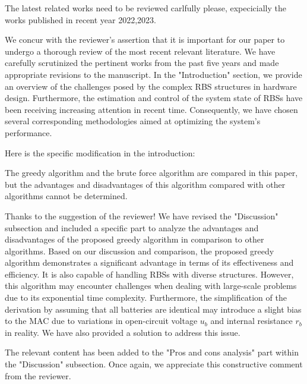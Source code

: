 \reviewer
\begin{revcomment}
  The latest related works need to be reviewed carlfully please, expecicially the works published in recent year 2022,2023.
\end{revcomment}
\begin{revresponse}

We concur with the reviewer's assertion that it is important for our paper to undergo a thorough review of the most recent relevant literature. 
We have carefully scrutinized the pertinent works from the past five years and made appropriate revisions to the manuscript.
In the "Introduction" section, we provide an overview of the challenges posed by the complex RBS structures in hardware design. 
Furthermore, the estimation and control of the system state of RBSs have been receiving increasing attention in recent time.
Consequently, we have chosen several corresponding methodologies aimed at optimizing the system's performance.


Here is the specific modification in the introduction:
\begin{changes}
\end{changes}

\end{revresponse}

\begin{revcomment}
  The greedy algorithm and the brute force algorithm are compared in this paper, but the advantages and disadvantages of this algorithm compared with other algorithms cannot be determined.
\end{revcomment}
\begin{revresponse}

Thanks to the suggestion of the reviewer! 
We have revised the "Discussion" subsection and included a specific part to analyze the advantages and disadvantages of the proposed greedy algorithm in comparison to other algorithms. 
Based on our discussion and comparison, the proposed greedy algorithm demonstrates a significant advantage in terms of its effectiveness and efficiency.
It is also capable of handling RBSs with diverse structures. 
However, this algorithm may encounter challenges when dealing with large-scale problems due to its exponential time complexity.
Furthermore, the simplification of the derivation by assuming that all batteries are identical may introduce a slight bias to the MAC due to variations in open-circuit voltage $u_b$ and internal resistance $r_b$ in reality.
We have also provided a solution to address this issue.


The relevant content has been added to the "Pros and cons analysis" part within the "Discussion" subsection. 
Once again, we appreciate this constructive comment from the reviewer.

\end{revresponse}

